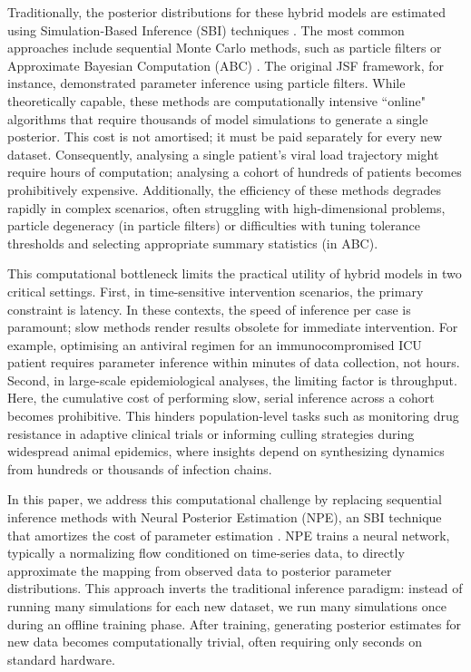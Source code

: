 \documentclass{article}
\begin{document}
Traditionally, the posterior distributions for these hybrid models are estimated using Simulation-Based Inference (SBI) techniques \cite{Cranmer2020NPE}. The most common approaches include sequential Monte Carlo methods, such as particle filters 
\cite{Arulampalam2002PF, Kitagawa1996PF} or Approximate Bayesian Computation (ABC) \cite{ABC}.
The original JSF framework, for instance, demonstrated parameter inference using particle filters. While theoretically capable, these methods are computationally intensive ``online" algorithms that require thousands of model simulations to generate a single posterior. This cost is not amortised; it must be paid separately for every new dataset. Consequently, analysing a single patient's viral load trajectory might require hours of computation; analysing a cohort of hundreds of patients becomes prohibitively expensive. Additionally, the efficiency of these methods degrades rapidly in complex scenarios, often struggling with high-dimensional problems, particle degeneracy (in particle filters) or difficulties with tuning tolerance thresholds and selecting appropriate summary statistics (in ABC). 



This computational bottleneck limits the practical utility of hybrid models in two critical settings. First, in time-sensitive intervention scenarios, the primary constraint is latency. In these contexts, the speed of inference per case is paramount; slow methods render results obsolete for immediate intervention. For example, optimising an antiviral regimen for an immunocompromised ICU patient requires parameter inference within minutes of data collection, not hours. Second, in large-scale epidemiological analyses, the limiting factor is throughput. Here, the cumulative cost of performing slow, serial inference across a cohort becomes prohibitive. This hinders population-level tasks such as monitoring drug resistance in adaptive clinical trials or informing culling strategies during widespread animal epidemics, where insights depend on synthesizing dynamics from hundreds or thousands of infection chains.



In this paper, we address this computational challenge by replacing sequential inference methods with Neural Posterior Estimation (NPE), an SBI technique that amortizes the cost of parameter estimation \cite{Papamakarios2016NPE, Greenberg2019NPE, Cranmer2020NPE}. NPE trains a neural network, typically a normalizing flow conditioned on time-series data, to directly approximate the mapping from observed data to posterior parameter distributions. This approach inverts the traditional inference paradigm: instead of running many simulations for each new dataset, we run many simulations once during an offline training phase. After training, generating posterior estimates for new data becomes computationally trivial, often requiring only seconds on standard hardware.
\end{document}

